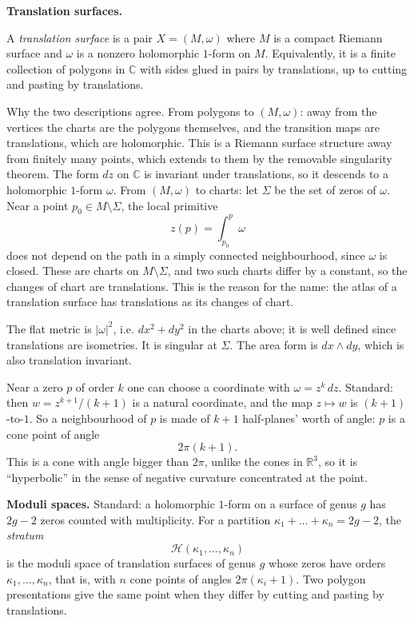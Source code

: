 \medskip\noindent
{\bf Translation surfaces.}

\begin{definition}
\label{definition-translation-surface-matheus}
A \textit{translation surface} is a pair
$X=(M,\omega)$ where $M$ is a compact Riemann
surface and $\omega$ is a nonzero holomorphic
$1$-form on $M$. Equivalently, it is a finite
collection of polygons in $\mathbb{C}$ with
sides glued in pairs by translations, up to
cutting and pasting by translations.
\end{definition}

Why the two descriptions agree. From
polygons to $(M,\omega)$: away from the
vertices the charts are the polygons
themselves, and the transition maps are
translations, which are holomorphic. This is
a Riemann surface structure away from
finitely many points, which extends to them
by the removable singularity theorem. The
form $dz$ on $\mathbb{C}$ is invariant under
translations, so it descends to a holomorphic
$1$-form $\omega$. From $(M,\omega)$ to
charts: let $\Sigma$ be the set of zeros of
$\omega$. Near a point $p_0\in
M\setminus\Sigma$, the local primitive
$$
z(p)=\int_{p_0}^{p}\omega
$$
does not depend on the path in a simply
connected neighbourhood, since $\omega$ is
closed. These are charts on
$M\setminus\Sigma$, and two such charts
differ by a constant, so the changes of chart
are translations. This is the reason for the
name: the atlas of a translation surface has
translations as its changes of chart.

The flat metric is $|\omega|^2$, i.e.
$dx^2+dy^2$ in the charts above; it is well
defined since translations are isometries. It
is singular at $\Sigma$. The area form is
$dx\wedge dy$, which is also translation
invariant.

Near a zero $p$ of order $k$ one can choose a
coordinate with $\omega=z^k\,dz$. Standard:
then $w=z^{k+1}/(k+1)$ is a natural
coordinate, and the map $z\mapsto w$ is
$(k+1)$-to-$1$. So a neighbourhood of $p$ is
made of $k+1$ half-planes' worth of angle:
$p$ is a cone point of angle
$$
2\pi(k+1).
$$
This is a cone with angle bigger than
$2\pi$, unlike the cones in $\mathbb{R}^3$,
so it is ``hyperbolic'' in the sense of
negative curvature concentrated at the point.

\medskip\noindent
{\bf Moduli spaces.} Standard: a holomorphic
$1$-form on a surface of genus $g$ has $2g-2$
zeros counted with multiplicity. For a
partition $\kappa_1+\dots+\kappa_n=2g-2$, the
\emph{stratum}
$$
\mathcal{H}(\kappa_1,\dots,\kappa_n)
$$
is the moduli space of translation surfaces
of genus $g$ whose zeros have orders
$\kappa_1,\dots,\kappa_n$, that is, with $n$
cone points of angles $2\pi(\kappa_i+1)$. Two
polygon presentations give the same point
when they differ by cutting and pasting by
translations.

